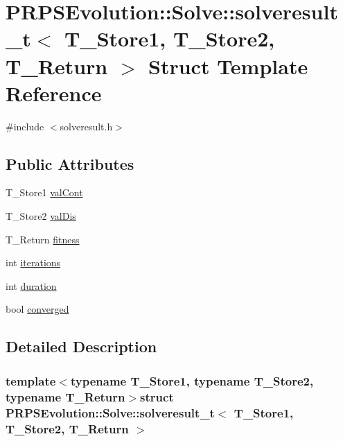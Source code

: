 \hypertarget{struct_p_r_p_s_evolution_1_1_solve_1_1solveresult__t}{\section{\-P\-R\-P\-S\-Evolution\-:\-:\-Solve\-:\-:solveresult\-\_\-t$<$ \-T\-\_\-\-Store1, \-T\-\_\-\-Store2, \-T\-\_\-\-Return $>$ \-Struct \-Template \-Reference}
\label{struct_p_r_p_s_evolution_1_1_solve_1_1solveresult__t}
}


{\ttfamily \#include $<$solveresult.\-h$>$}

\subsection*{\-Public \-Attributes}
\begin{DoxyCompactItemize}
\item 
\-T\-\_\-\-Store1 \hyperlink{struct_p_r_p_s_evolution_1_1_solve_1_1solveresult__t_a9a49bd614802e9e690f9705792991f9d}{val\-Cont}
\item 
\-T\-\_\-\-Store2 \hyperlink{struct_p_r_p_s_evolution_1_1_solve_1_1solveresult__t_ad7bff6e85f584c6a6af9801ffbc8eba2}{val\-Dis}
\item 
\-T\-\_\-\-Return \hyperlink{struct_p_r_p_s_evolution_1_1_solve_1_1solveresult__t_ad5da06f8fa0f601b2a573c782ff096fb}{fitness}
\item 
int \hyperlink{struct_p_r_p_s_evolution_1_1_solve_1_1solveresult__t_a6c8ef0cf18e264949a2160e486a36ebb}{iterations}
\item 
int \hyperlink{struct_p_r_p_s_evolution_1_1_solve_1_1solveresult__t_ac391447c4640f2c3e9c9a2a07f6218a8}{duration}
\item 
bool \hyperlink{struct_p_r_p_s_evolution_1_1_solve_1_1solveresult__t_a3f95d8ab798f1c94c65caf7b8231461b}{converged}
\end{DoxyCompactItemize}


\subsection{\-Detailed \-Description}
\subsubsection*{template$<$typename \-T\-\_\-\-Store1, typename \-T\-\_\-\-Store2, typename \-T\-\_\-\-Return$>$struct P\-R\-P\-S\-Evolution\-::\-Solve\-::solveresult\-\_\-t$<$ T\-\_\-\-Store1, T\-\_\-\-Store2, T\-\_\-\-Return $>$}

